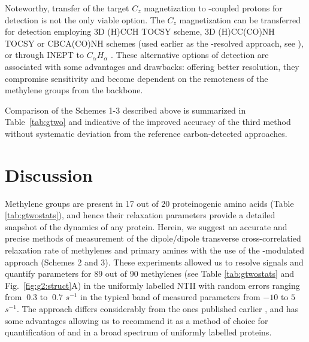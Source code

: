 \documentclass[twocolumn]{svjour3}           %
\begin{document}
Noteworthy, transfer of the target $C_z$ magnetization to \oneJch-coupled
protons for detection is not the only viable
option. The $C_z$ magnetization can be transferred for detection employing 
3D {(H)CCH} {TOCSY} scheme, 3D {(H)CC(CO)NH} {TOCSY} or CBCA(CO)NH schemes 
(used earlier as the \oneJch-resolved approach, see
\cite{zheng_measurement_2004,yang_1h13c_1999}), or
through {INEPT} to $C_\alpha H_\alpha$ \cite{banci_side_2001}. These
alternative options of detection are associated with some advantages and
drawbacks: offering better resolution, they compromise sensitivity and
become dependent on the remoteness of the methylene groups from the
backbone. 

Comparison of the Schemes 1-3 described above is summarized in
Table~\ref{tab:gtwo} and indicative of the improved accuracy of the third 
method without systematic deviation from the reference carbon-detected
approaches. 

\section{Discussion}
Methylene groups are present in 17 out of 20 proteinogenic amino acids
(Table \ref{tab:gtwostats}), and hence their relaxation parameters provide a detailed
snapshot of the dynamics of any protein. Herein, we suggest an accurate 
and precise methods of measurement of the dipole/dipole transverse
cross-correlatied relaxation rate \gtwo{} of me\-thy\-le\-nes and primary 
amines with 
the use of the \oneJch-modulated approach (Schemes 2 and 3). These 
experiments allowed us to resolve signals and
quantify \gtwoCH{} parameters for 89 out of 90 methylenes 
(see Table \ref{tab:gtwostats} and Fig.~\ref{fig:g2:struct}A) 
in the uniformly \nclab{} labelled {NTII} with random errors ranging 
from $~0.3$ to $~0.7$ $s^{-1}$ in the typical band of measured parameters 
from $-10$ to $5$ $s^{-1}$. The approach differs considerably from the ones
published earlier \cite{banci_side_2001,zheng_measurement_2004}, and has
some advantages allowing us to recommend it as a method of choice for
quantification of \gtwoCH{} and \gtwoNH{} in a broad spectrum of 
uniformly \nclab{} labelled proteins.
\end{document}

